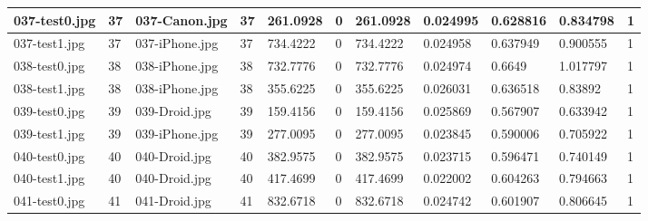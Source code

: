 \begin{landscape}
\begin{longtable}{|p{2cm}|p{1cm}|p{2cm}|p{1cm}|p{2cm}|p{1cm}|p{2cm}|p{2cm}|p{2cm}|p{2cm}|p{1cm}|}
		037-test0.jpg   & 37               & 037-Canon.jpg         & 37                          & 261.0928              & 0                       & 261.0928                   & 0.024995              & 0.628816              & 0.834798                 & 1                \\ \hline
		037-test1.jpg   & 37               & 037-iPhone.jpg        & 37                          & 734.4222              & 0                       & 734.4222                   & 0.024958              & 0.637949              & 0.900555                 & 1                \\ \hline
		038-test0.jpg   & 38               & 038-iPhone.jpg        & 38                          & 732.7776              & 0                       & 732.7776                   & 0.024974              & 0.6649                & 1.017797                 & 1                \\ \hline
		038-test1.jpg   & 38               & 038-iPhone.jpg        & 38                          & 355.6225              & 0                       & 355.6225                   & 0.026031              & 0.636518              & 0.83892                  & 1                \\ \hline
		039-test0.jpg   & 39               & 039-Droid.jpg         & 39                          & 159.4156              & 0                       & 159.4156                   & 0.025869              & 0.567907              & 0.633942                 & 1                \\ \hline
		039-test1.jpg   & 39               & 039-iPhone.jpg        & 39                          & 277.0095              & 0                       & 277.0095                   & 0.023845              & 0.590006              & 0.705922                 & 1                \\ \hline
		040-test0.jpg   & 40               & 040-Droid.jpg         & 40                          & 382.9575              & 0                       & 382.9575                   & 0.023715              & 0.596471              & 0.740149                 & 1                \\ \hline
		040-test1.jpg   & 40               & 040-Droid.jpg         & 40                          & 417.4699              & 0                       & 417.4699                   & 0.022002              & 0.604263              & 0.794663                 & 1                \\ \hline
		041-test0.jpg   & 41               & 041-Droid.jpg         & 41                          & 832.6718              & 0                       & 832.6718                   & 0.024742              & 0.601907              & 0.806645                 & 1                \\ \hline

\end{longtable}
\end{landscape}

